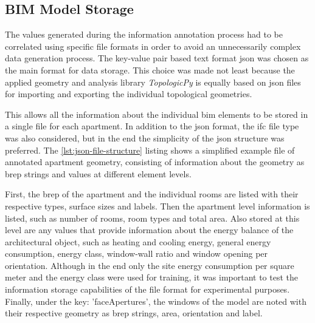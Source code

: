 \documentclass[a4paper, 12pt]{report}
\begin{document}
\subsection{BIM Model Storage}\label{subsec:bim-model-storage}

The values generated during the information annotation process had to be correlated using specific file formats in order to avoid an unnecessarily complex data generation process. The key-value pair based text format \acrshort{json} was chosen as the main format for data storage. This choice was made not least because the applied geometry and analysis library \textit{TopologicPy} is equally based on \acrshort{json} files for importing and exporting the individual topological geometries.

This allows all the information about the individual \acrshort{bim} elements to be stored in a single file for each apartment. In addition to the \acrshort{json} format, the \acrshort{ifc} file type was also considered, but in the end the simplicity of the \acrshort{json} structure was preferred. The \ref{lst:json-file-structure} listing shows a simplified example file of annotated apartment geometry, consisting of information about the geometry as \acrshort{brep} strings and values at different element levels.

First, the \acrshort{brep} of the apartment and the individual rooms are listed with their respective types, surface sizes and labels. Then the apartment level information is listed, such as number of rooms, room types and total area. Also stored at this level are any values that provide information about the energy balance of the architectural object, such as heating and cooling energy, general energy consumption, energy class, window-wall ratio and window opening per orientation. Although in the end only the \gls{site energy consumption} per square meter and the energy class were used for training, it was important to test the information storage capabilities of the file format for experimental purposes. Finally, under the key: 'faceApertures', the windows of the model are noted with their respective geometry as brep strings, area, orientation and label.
\end{document}
